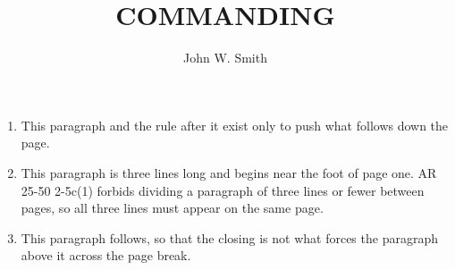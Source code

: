 \documentclass{../armymemo}
\author{John W. Smith}\rank{CPT}\branch{CY}
\title{COMMANDING}
\begin{document}
\begin{enumerate}
	\item This paragraph and the rule after it exist only to push what follows down
	      the page.\rule[-5.7in]{0pt}{0pt}
	\item This paragraph is three lines long and begins near the foot of page one.
	      AR 25-50 2-5c(1) forbids dividing a paragraph of three lines or fewer
	      between pages, so all three lines must appear on the same page.
	\item This paragraph follows, so that the closing is not what forces the
	      paragraph above it across the page break.
\end{enumerate}
\end{document}
